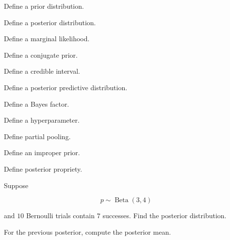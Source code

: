 \begin{exercise}[1]
Define a prior distribution.
\end{exercise}

\begin{exercise}[1]
Define a posterior distribution.
\end{exercise}

\begin{exercise}[1]
Define a marginal likelihood.
\end{exercise}

\begin{exercise}[1]
Define a conjugate prior.
\end{exercise}

\begin{exercise}[1]
Define a credible interval.
\end{exercise}

\begin{exercise}[1]
Define a posterior predictive distribution.
\end{exercise}

\begin{exercise}[1]
Define a Bayes factor.
\end{exercise}

\begin{exercise}[1]
Define a hyperparameter.
\end{exercise}

\begin{exercise}[1]
Define partial pooling.
\end{exercise}

\begin{exercise}[1]
Define an improper prior.
\end{exercise}

\begin{exercise}[1]
Define posterior propriety.
\end{exercise}

\begin{exercise}[2]
Suppose

\[
p
\sim
\operatorname{Beta}(3,4)
\]

and \(10\) Bernoulli trials contain \(7\) successes. Find the posterior
distribution.
\end{exercise}

\begin{exercise}[2]
For the previous posterior, compute the posterior mean.
\end{exercise}

